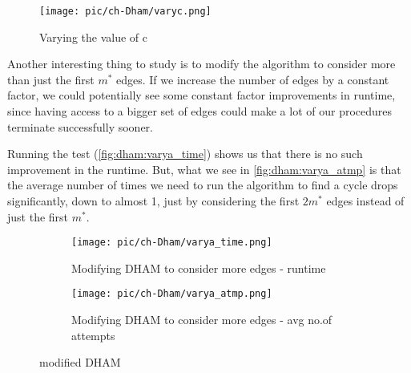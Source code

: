 \begin{figure}[H]

\centering
\texttt{[image: pic/ch-Dham/varyc.png]}
\caption{Varying the value of c}
\label{fig:dham:varyc}

\end{figure}

Another interesting thing to study is to modify the algorithm to consider more than just the first $m^*$ edges. If we increase the number of edges by a constant factor, we could potentially see some constant factor improvements in runtime, since having access to a bigger set of edges could make a lot of our procedures terminate successfully sooner. 

Running the test (\autoref{fig:dham:varya_time}) shows us that there is no such improvement in the runtime. But, what we see in \autoref{fig:dham:varya_atmp} is that the average number of times we need to run the algorithm to find a cycle drops significantly, down to almost 1, just by considering the first $2m^*$ edges instead of just the first $m^*$. 


\begin{figure}[ht]

\begin{subfigure}{\textwidth}
\centering
\texttt{[image: pic/ch-Dham/varya\_time.png]}
\caption{Modifying DHAM to consider more edges - runtime}
\label{fig:dham:varya_time}
\end{subfigure}
\begin{subfigure}{\textwidth}
\centering
\texttt{[image: pic/ch-Dham/varya\_atmp.png]}
\caption{Modifying DHAM to consider more edges - avg no.of attempts}
\label{fig:dham:varya_atmp}
\end{subfigure}

\caption{modified DHAM}
\label{fig:dham:expt}
\end{figure}